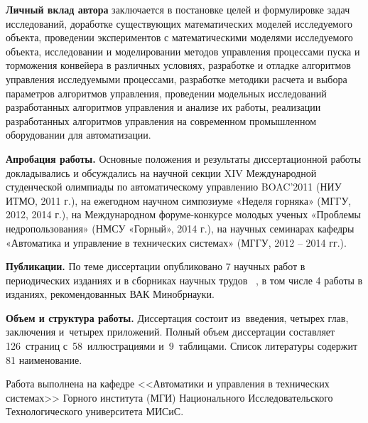 \textbf{Личный вклад автора} заключается в постановке целей и формулировке задач исследований, доработке существующих математических моделей исследуемого объекта, проведении экспериментов с математическими моделями исследуемого объекта, исследовании и моделировании методов управления процессами пуска и торможения конвейера в различных условиях, разработке и отладке алгоритмов управления исследуемыми процессами, разработке методики расчета и выбора параметров алгоритмов управления, проведении модельных исследований разработанных алгоритмов управления и анализе их работы, реализации разработанных алгоритмов управления на современном промышленном оборудовании для автоматизации.
\bigskip

\textbf{Апробация работы.} Основные положения и результаты диссертационной работы докладывались и обсуждались на научной секции XIV Международной студенческой олимпиады по автоматическому управлению BOAC’2011 (НИУ ИТМО, 2011 г.), на ежегодном научном симпозиуме «Неделя горняка» (МГГУ, 2012, 2014 г.), на Международном форуме-конкурсе молодых ученых «Проблемы недропользования» (НМСУ «Горный», 2014 г.), на научных семинарах кафедры «Автоматика и управление в технических системах» (МГГУ, 2012 -- 2014 гг.).

\bigskip
\textbf{Публикации.} По теме диссертации опубликовано 7 научных работ в периодических изданиях и в сборниках научных трудов ~\cite{bib1, bib2, bib3, bib4, bib6, bib7, bib8}, в том числе 4 работы в изданиях, рекомендованных ВАК Минобрнауки.

\bigskip
\textbf{Объем и структура работы.} Диссертация состоит из~введения, четырех глав, заключения и~четырех приложений. Полный объем диссертации составляет 126~страниц с~58~иллюстрациями и~9~таблицами. Список литературы содержит 81 наименование.

\bigskip
Работа выполнена на кафедре <<Автоматики и управления в технических системах>> Горного института (МГИ) Национального Исследовательского Технологического университета МИСиС.

\clearpage